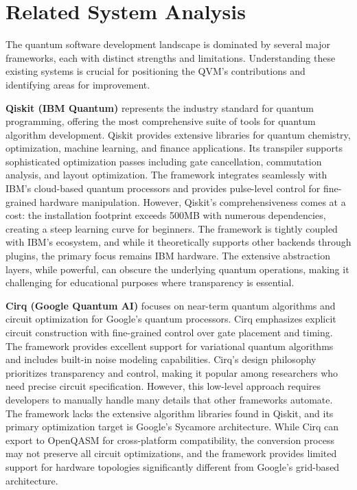 
\section{Related System Analysis}

The quantum software development landscape is dominated by several major frameworks, each with distinct strengths and limitations. Understanding these existing systems is crucial for positioning the QVM's contributions and identifying areas for improvement.

\textbf{Qiskit (IBM Quantum)} represents the industry standard for quantum programming, offering the most comprehensive suite of tools for quantum algorithm development. Qiskit provides extensive libraries for quantum chemistry, optimization, machine learning, and finance applications. Its transpiler supports sophisticated optimization passes including gate cancellation, commutation analysis, and layout optimization. The framework integrates seamlessly with IBM's cloud-based quantum processors and provides pulse-level control for fine-grained hardware manipulation. However, Qiskit's comprehensiveness comes at a cost: the installation footprint exceeds 500MB with numerous dependencies, creating a steep learning curve for beginners. The framework is tightly coupled with IBM's ecosystem, and while it theoretically supports other backends through plugins, the primary focus remains IBM hardware. The extensive abstraction layers, while powerful, can obscure the underlying quantum operations, making it challenging for educational purposes where transparency is essential.

\textbf{Cirq (Google Quantum AI)} focuses on near-term quantum algorithms and circuit optimization for Google's quantum processors. Cirq emphasizes explicit circuit construction with fine-grained control over gate placement and timing. The framework provides excellent support for variational quantum algorithms and includes built-in noise modeling capabilities. Cirq's design philosophy prioritizes transparency and control, making it popular among researchers who need precise circuit specification. However, this low-level approach requires developers to manually handle many details that other frameworks automate. The framework lacks the extensive algorithm libraries found in Qiskit, and its primary optimization target is Google's Sycamore architecture. While Cirq can export to OpenQASM for cross-platform compatibility, the conversion process may not preserve all circuit optimizations, and the framework provides limited support for hardware topologies significantly different from Google's grid-based architecture.

